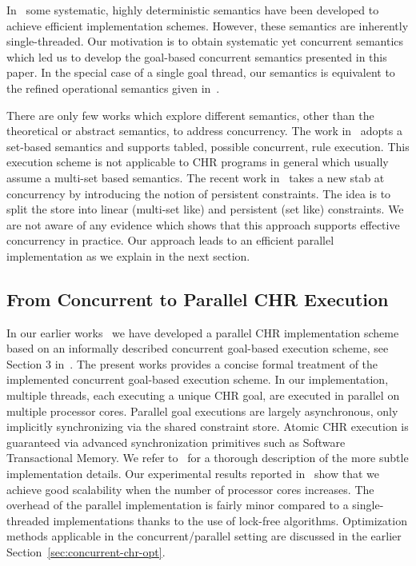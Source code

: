 \documentclass{tlp}
\begin{document}
In~\cite{DuckSBH04,rp-chr,rp-chr} some systematic, highly deterministic semantics have been developed
to achieve efficient implementation schemes. However, these semantics are inherently single-threaded.
Our motivation is to obtain systematic yet concurrent semantics which led us to develop
the goal-based concurrent semantics presented in this paper.
In the special case of a single goal thread, our semantics is equivalent 
to the refined operational semantics given in~\cite{DuckSBH04,rp-chr,rp-chr}.

There are only few works which explore different semantics, other than the theoretical or abstract semantics, 
to address concurrency.  The work in~\cite{DBLP:conf/padl/Sarna-StarostaR07} adopts a set-based semantics
and supports tabled, possible concurrent, rule execution. 
This execution scheme is not applicable to
CHR programs in general which usually assume a multi-set based semantics.
The recent work in~\cite{betz_raiser_fru_persistent_constraints_wlp09}
takes a new stab at concurrency by introducing the notion of persistent
constraints. The idea is to split the store into linear (multi-set like) and persistent (set like)
constraints. We are not aware of any evidence which shows that this approach 
supports effective concurrency in practice. Our approach leads to
an efficient parallel implementation as we explain in the next section.

\subsection{From Concurrent to Parallel CHR Execution} \label{sec:from-concurrent-to-parallel}

In our earlier works~\cite{chr-stm,parallel-chr} we have developed a parallel CHR implementation
scheme based on an informally described concurrent goal-based execution scheme, 
see Section 3 in~\cite{parallel-chr}. 
The present works provides a concise formal treatment of the implemented concurrent goal-based 
execution scheme. In our implementation, multiple threads, each executing a unique CHR goal, 
are executed in parallel on multiple processor cores. Parallel goal executions are largely asynchronous, 
only implicitly synchronizing via the shared constraint store. Atomic CHR execution is guaranteed via 
advanced synchronization primitives such as Software Transactional Memory.
We refer to~\cite{parallel-chr} for a thorough description of the more subtle implementation details.
Our experimental results reported in~\cite{parallel-chr} show that we achieve good scalability
when the number of processor cores increases. The overhead of the parallel implementation 
is fairly minor compared to a single-threaded implementations thanks to the use of lock-free algorithms.
Optimization methods applicable in the concurrent/parallel setting
are discussed in the earlier Section~\ref{sec:concurrent-chr-opt}.
\end{document}
